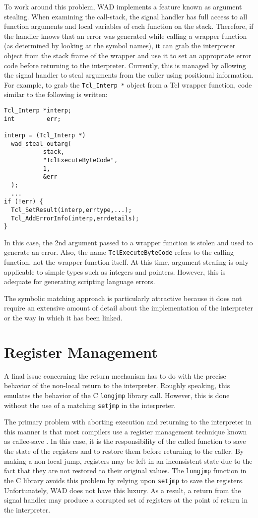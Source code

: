 To work around this problem, WAD implements a feature
known as argument stealing.  When examining the call-stack, the signal
handler has full access to all function arguments and local variables of each function
on the stack.
Therefore, if the handler knows that an error was generated while
calling a wrapper function (as determined by looking at the symbol names),
it can grab the interpreter object from the stack frame of the wrapper and
use it to set an appropriate error code before returning to the interpreter.
Currently, this is managed by allowing the signal handler to steal
arguments from the caller using positional information.
For example, to grab the {\tt Tcl\_Interp *} object from a Tcl wrapper function,
code similar to the following is written:

\begin{verbatim}
Tcl_Interp *interp;
int         err;

interp = (Tcl_Interp *)
  wad_steal_outarg(
           stack,                
           "TclExecuteByteCode",
           1,
           &err
  );
  ...
if (!err) {
  Tcl_SetResult(interp,errtype,...);
  Tcl_AddErrorInfo(interp,errdetails);
}
\end{verbatim}

In this case, the 2nd argument passed to a wrapper function 
is stolen and used to generate an error.  Also, the name {\tt TclExecuteByteCode}
refers to the calling function, not the wrapper function itself.
At this time, argument stealing is only applicable to simple types
such as integers and pointers.  However, this is adequate for generating
scripting language errors.

The symbolic matching approach is particularly attractive because it
does not require an extensive amount of detail about the
implementation of the interpreter or the way in which it has been
linked.  

\section{Register Management}

A final issue concerning the return mechanism has to do with the
precise behavior of the non-local return to the interpreter.  Roughly
speaking, this emulates the behavior of the C {\tt longjmp}
library call.  However, this is done without the use of a matching
{\tt setjmp} in the interpreter.  

The primary problem with aborting execution and returning to the
interpreter in this manner is that most compilers use a register
management technique known as callee-save \cite{prag}.  In this case,
it is the responsibility of the called function to save the state of
the registers and to restore them before returning to the caller. By
making a non-local jump, registers may be left in an inconsistent
state due to the fact that they are not restored to their original
values.  The {\tt longjmp} function in the C library avoids this
problem by relying upon {\tt setjmp} to save the registers.  Unfortunately,
WAD does not have this luxury.   As a result, a return from the signal
handler may produce a corrupted set of registers at the point of return
in the interpreter.

